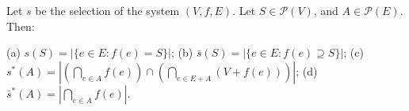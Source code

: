Let $s$ be the selection of the system $(V, f, E)$. Let $S \in \mathcal{P}(V)$, and $A \in \mathcal{P}(E)$. Then:

(a) $s(S) = |\{e \in E: f(e) = S\}|$;
(b) $\bar{s}(S) = |\{e \in E: f(e) \supseteq S\}|$;
(c) $s^*(A) = |(\bigcap_{e \in A} f(e)) \cap (\bigcap_{e \in E + A} (V + f(e)))|$;
(d) $\bar{s}^*(A) = |\bigcap_{e \in A} f(e)|$.
